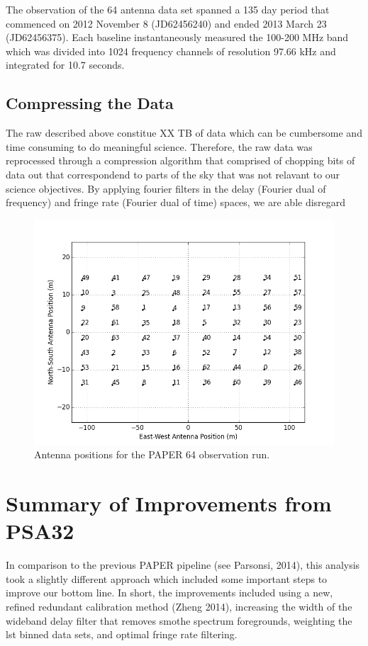 \documentclass[twocolumn,numberedappendix]{emulateapj}
\begin{document}
The observation of the 64 antenna data set spanned a 135 day period that
commenced on 2012 November 8 (JD62456240) and ended  2013 March 23 (JD62456375). 
Each baseline instantaneously measured the 100-200 MHz band which was divided
into 1024 frequency channels of resolution 97.66 kHz and integrated for 10.7
seconds.  

\subsection{Compressing the Data}
The raw described above constitue XX TB of data which can be cumbersome and time
consuming to do meaningful science. Therefore, the raw data was reprocessed
through a compression algorithm that comprised of chopping bits of data out that
correspondend to parts of the sky that was not relavant to our science
objectives. By applying fourier filters in the delay (Fourier dual of frequency)
and fringe rate (Fourier dual of time) spaces, we are able disregard 

\begin{figure}\centering
\includegraphics[width=1.85\columnwidth]{plots/antenna_positions.png}
\caption{Antenna positions for the PAPER 64 observation run.}
\label{fig:antenna_positions}
\end{figure}

\section{Summary of Improvements from PSA32}
In comparison to the previous PAPER pipeline (see Parsonsi, 2014), this analysis
took a slightly different approach which included some important steps to
improve our bottom line. In short, the improvements included using a new, 
refined redundant calibration method (Zheng 2014), increasing the width of the
wideband delay filter that removes smothe spectrum foregrounds, weighting the
lst binned data sets, and optimal fringe rate filtering. 
\end{document}
